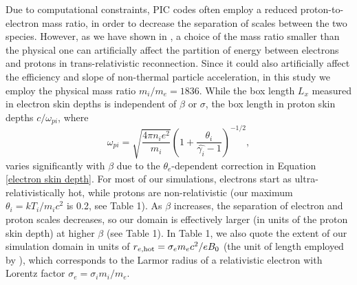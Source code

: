 Due to computational constraints, PIC codes often employ a reduced proton-to-electron mass ratio, in order to decrease the separation of scales between the two species. However, as we have shown in  \citealt{rowan2017}, a choice of the mass ratio smaller than the physical one can artificially affect the partition of energy between electrons and protons in trans-relativistic reconnection. Since it could also artificially affect the efficiency and slope of non-thermal particle acceleration, in this study we employ the physical mass ratio $m_{i}/m_{e}=1836$. While the box length $L_x$ measured in electron skin depths is independent of $\beta$ or $\sigma$, the box length in proton skin depths $c/\omega_{pi}$, where
$$
\omega_{pi} =\sqrt{\frac{4\pi n_{i}e^{2}}{m_{i}}}\left(1+\frac{\theta_{i}}{\hat{\gamma_{i}}-1}\right)^{-1/2},
$$ 
varies significantly with $\beta$ due to the $\theta_e$-dependent correction in Equation \ref{electron skin depth}.  For most of our simulations, electrons start as ultra-relativistically hot, while protons are non-relativistic (our maximum $\theta_{i}=kT_i/m_i c^2$ is 0.2, see Table 1).  As  $\beta$ increases, the separation of electron and proton scales decreases, so our domain is effectively larger (in units of the proton skin depth) at higher $\beta$ (see Table 1). In Table 1, we also quote the extent of our simulation domain in units of $r_{e,\rm hot}=\sigma_e m_e c^2/eB_0$ (the unit of length employed by \citealt{werner2018}), which corresponds to the Larmor radius of a relativistic electron with Lorentz factor $\sigma_e=\sigma_i m_i/m_e$.



